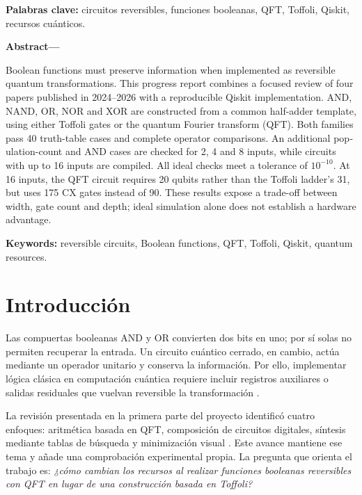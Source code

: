 \documentclass[10pt,a4paper,twocolumn]{article}
\begin{document}
\smallskip\noindent\textbf{Palabras clave:} circuitos reversibles, funciones booleanas,
QFT, Toffoli, Qiskit, recursos cuánticos.

\medskip\noindent\textbf{Abstract---}
\begin{otherlanguage}{english}
Boolean functions must preserve information when implemented as reversible
quantum transformations. This progress report combines a focused review of four
papers published in 2024--2026 with a reproducible Qiskit implementation.
AND, NAND, OR, NOR and XOR are constructed from a common half-adder template,
using either Toffoli gates or the quantum Fourier transform (QFT).
Both families pass 40 truth-table cases and complete operator comparisons.
An additional \ValidationCases{} population-count and AND cases are checked for
2, 4 and 8 inputs, while circuits with up to 16 inputs are compiled.
All ideal checks meet a tolerance of $10^{-10}$. At 16 inputs, the QFT circuit
requires 20 qubits rather than the Toffoli ladder's 31, but uses 175 CX gates
instead of 90. These results expose a trade-off between width, gate count and
depth; ideal simulation alone does not establish a hardware advantage.
\end{otherlanguage}

\smallskip\noindent\textbf{Keywords:} reversible circuits, Boolean functions,
QFT, Toffoli, Qiskit, quantum resources.

\section{Introducción}
Las compuertas booleanas AND y OR convierten dos bits en uno; por sí solas no
permiten recuperar la entrada. Un circuito cuántico cerrado, en cambio, actúa
mediante un operador unitario y conserva la información. Por ello, implementar
lógica clásica en computación cuántica requiere incluir registros auxiliares o
salidas residuales que vuelvan reversible la transformación \cite{nielsen2010}.

La revisión presentada en la primera parte del proyecto identificó cuatro
enfoques: aritmética basada en QFT, composición de circuitos digitales,
síntesis mediante tablas de búsqueda y minimización visual
\cite{kaltehei2026,escanez2026,clarino2025,hajjdiab2024}.
Este avance mantiene ese tema y añade una comprobación experimental propia.
La pregunta que orienta el trabajo es: \emph{¿cómo cambian los recursos al
realizar funciones booleanas reversibles con QFT en lugar de una construcción
basada en Toffoli?}
\end{document}
